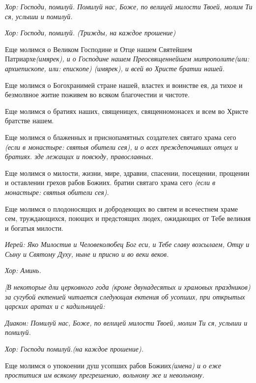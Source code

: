 \itshape  Хор:\normalfont{} Господи, помилуй. Помилуй нас, Боже, по велицей милости Твоей, молим Ти ся, услыши и помилуй.


\itshape  Хор:\normalfont{} Господи, помилуй. \itshape (Трижды, на каждое прошение)\normalfont{} 


Еще молимся о Великом Господине и Отце нашем Святейшем Патриархе\itshape  (имярек)\normalfont{}, и о Господине нашем Преосвященнейшем митрополите\itshape  (или:\normalfont{} архиепископе\itshape , или:\normalfont{} епископе\itshape ) (имярек)\normalfont{}, и всей во Христе братии нашей. 


Еще молимся о Богохранимей стране нашей, властех и воинстве ея, да тихое и безмолвное житие поживем во всяком благочестии и чистоте. 


Еще молимся о братиях наших, священицех, священномонасех и всем во Христе братстве нашем.


Еще молимся о блаженных и приснопамятных создателех святаго храма сего \itshape (если в монастыре:\normalfont{} святыя обители сея), и о всех преждепочивших отцех и братиях. зде лежащих и повсюду, православных. 


Еще молимся о милости, жизни, мире, здравии, спасении, посещении, прощении и оставлении грехов рабов Божиих. братии святаго храма сего \itshape (если в монастыре:\normalfont{} святыя обители сея). 


Еще молимся о плодоносящих и добродеющих во святем и всечестнем храме сем, труждающихся, поющих и предстоящих людех, ожидающих от Тебе великия и богатыя милости.


\itshape Иерей:\normalfont{} Яко Милостив и Человеколюбец Бог еси, и Тебе славу возсылаем, Отцу и Сыну и Святому Духу, ныне и присно и во веки веков.


\itshape Хор\normalfont{}: Аминь.


\itshape [В некоторые дли церковного года (кроме двунадесятых и храмовых праздников) за сугубой ектенией читается следующая ектения об усопших, при открытых царских аратах и с кадильницей:\normalfont{}




\itshape Диакон:\normalfont{} Помилуй нас, Боже, по велицей милости Твоей, молим Ти ся, услыши и помилуй.


\itshape  Хор:\normalfont{} Господи помилуй.\itshape  (на каждое прошение)\normalfont{}. 


Еще молимся о упокоении душ усопших рабов Божиих\itshape  (имена)\normalfont{} и о еже проститися им всякому прегрешению, вольному же и невольному.



